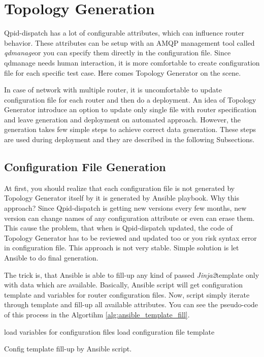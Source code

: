 \section{Topology Generation}
Qpid-dispatch has a lot of configurable attributes, which can influence router behavior. These attributes can be setup with an AMQP management tool called \emph{qdmanage}\footnotemark or you can specify them directly in the configuration file. Since qdmanage needs human interaction, it is more comfortable to create configuration file for each specific test case. Here comes Topology Generator on the scene.


In case of network with multiple router, it is uncomfortable to update configuration file for each router and then do a deployment. An idea of Topology Generator introduce an option to update only single file with router specification and leave generation and deployment on automated approach. However, the generation takes few simple steps to achieve correct data generation. These steps are used during deployment and they are described in the following Subsections.

\subsection{Configuration File Generation}
At first, you should realize that each configuration file is not generated by Topology Generator itself by it is generated by Ansible playbook. Why this approach? Since Qpid-dispatch is getting new versions every few months, new version can change names of any configuration attribute or even can erase them. This cause the problem, that when is Qpid-dispatch updated, the code of Topology Generator has to be reviewed and updated too or you risk syntax error in configuration file. This approach is not very stable. Simple solution is let Ansible to do final generation.

The trick is, that Ansible is able to fill-up any kind of passed \emph{Jinja2}\footnotemark template only with data which are available. Basically, Ansible script will get configuration template and variables for router configuration files. Now, script simply iterate through template and fill-up all available attributes. You can see the pseudo-code of this process in the Algortihm \ref{alg:ansible_template_fill}.

\begin{center}
	\begin{algorithm}[H]
		 load variables for configuration files\;
		 load configuration file template\;
		 \caption{Config template fill-up by Ansible script.}
		 \label{alg:ansible_template_fill}
	\end{algorithm}
\end{center}

